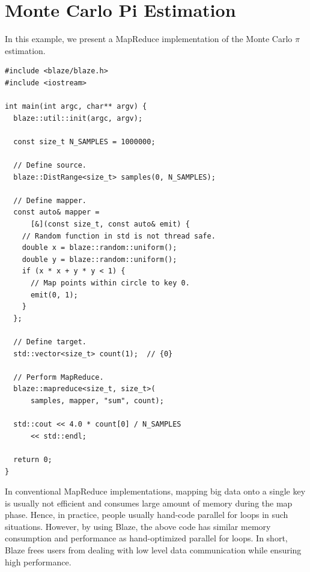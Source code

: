 \documentclass{sigkddExp}
\begin{document}
\section{Monte Carlo Pi Estimation}

In this example, we present a MapReduce implementation of the Monte Carlo $\pi$ estimation.

\begin{lstlisting}
#include <blaze/blaze.h>
#include <iostream>

int main(int argc, char** argv) {
  blaze::util::init(argc, argv);
  
  const size_t N_SAMPLES = 1000000;

  // Define source.
  blaze::DistRange<size_t> samples(0, N_SAMPLES);

  // Define mapper.
  const auto& mapper = 
      [&](const size_t, const auto& emit) {
    // Random function in std is not thread safe.
    double x = blaze::random::uniform();
    double y = blaze::random::uniform();
    if (x * x + y * y < 1) {
      // Map points within circle to key 0.
      emit(0, 1);
    }
  };

  // Define target.
  std::vector<size_t> count(1);  // {0}

  // Perform MapReduce.
  blaze::mapreduce<size_t, size_t>(
      samples, mapper, "sum", count);

  std::cout << 4.0 * count[0] / N_SAMPLES
      << std::endl;
  
  return 0;
}
\end{lstlisting}

In conventional MapReduce implementations, mapping big data onto a single key is usually not efficient and consumes large amount of memory during the map phase.
Hence, in practice, people usually hand-code parallel for loops in such situations.
However, by using Blaze, the above code has similar memory consumption and performance as hand-optimized parallel for loops.
In short, Blaze frees users from dealing with low level data communication while ensuring high performance.

\end{document}
